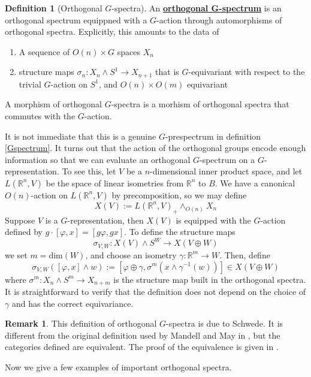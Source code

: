 \documentclass{article}
\theoremstyle{definition}
\newtheorem{definition}[theorem]{Definition}
\newtheorem{remark}[theorem]{Remark}
\begin{document}
\begin{tcolorbox}[colback=purple!5!white,colframe=purple!75!black]
\begin{definition}[Orthogonal $G$-spectra]
An \underline{\textbf{orthogonal G-spectrum}} is an orthogonal spectrum equippned with a $G$-action through automorphisms of orthogonal spectra. Explicitly, this amounts to the data of 
\begin{enumerate}
    \item A sequence of $O(n)\times G$ spaces $X_n$
    \item structure maps $\sigma_n: X_n\wedge S^1\to X_{n+1}$ that is $G$-equivariant with respect to the trivial $G$-action on $S^1$, and $O(n)\times O(m)$ equivariant 
\end{enumerate}

A morphism of orthogonal $G$-spectra is a morhism of orthogonal spectra that commutes with the $G$-action. 
\end{definition}
\end{tcolorbox}
It is not immediate that this is a genuine $G$-prespectrum in definition \ref{Gspectrum}. It turns out that the action of the orthogonal groups encode enough information so that we can evaluate an orthogonal $G$-spectrum on a $G$-representation. To see this, let $V$ be a $n$-dimensional inner product space, and let $L(\mathbb{R}^n, V)$ be the space of linear isometries from $\mathbb{R}^n$ to $B$. We have a canonical $O(n)$-action on $L(\mathbb{R}^n, V)$ by precomposition, so we may define 
\[X(V):=L(\mathbb{R}^n, V)_+\wedge_{O(n)}X_n\]
Suppose $V$ is a $G$-representation, then $X(V)$ is equipped with the $G$-action defined by $g\cdot [\varphi, x]=[g\varphi, gx]$. To define the structure maps 
\[\sigma_{V,W}: X(V)\wedge S^W\to X(V\oplus W)\]
 we set $m=\textrm{dim}(W)$, and choose an isometry $\gamma: \mathbb{R}^m\to W$. Then, define 
 \[\sigma_{V,W}([\varphi,x]\wedge w):=[\varphi\oplus \gamma, \sigma^m(x\wedge \gamma^{-1}(w))]\in X(V\oplus W)\]
where $\sigma^m:X_n\wedge S^m\to X_{n+m} $ is the structure map built in the orthogonal spectra. It is straightforward to verify that the definition does not depend on the choice of $\gamma$ and has the correct equivariance. 


\begin{tcolorbox}[colback=green!5!white,colframe=green!30!white]
\begin{remark}
This definition of orthogonal $G$-spectra is due to Schwede. It is different from the original definition used by Mandell and May in \cite{MM}, but the categories defined are equivalent. The proof of the equivalence is given in \cite{Schwede}.
\end{remark}
\end{tcolorbox}
Now we give a few examples of important orthogonal spectra.
\end{document}
